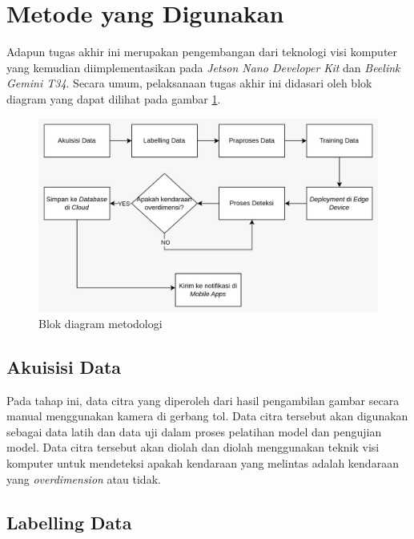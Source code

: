 \section{Metode yang Digunakan}

Adapun tugas akhir ini merupakan pengembangan dari teknologi visi komputer yang kemudian diimplementasikan pada \emph{Jetson Nano Developer Kit} dan \emph{Beelink Gemini T34}. Secara umum, pelaksanaan tugas akhir ini didasari oleh blok diagram yang dapat dilihat pada gambar \ref{fig:blockdiagrammethod}.

\begin{figure}[H]
  \centering

  \includegraphics[scale=0.25]{gambar/bab3-block-diagram.jpeg}

  \caption{Blok diagram metodologi}
  \label{fig:blockdiagrammethod}
\end{figure}

\subsection{Akuisisi Data}

Pada tahap ini, data citra yang diperoleh dari hasil pengambilan gambar secara manual menggunakan kamera di gerbang tol. Data citra tersebut akan digunakan sebagai data latih dan data uji dalam proses pelatihan model dan pengujian model. Data citra tersebut akan diolah dan diolah menggunakan teknik visi komputer untuk mendeteksi apakah kendaraan yang melintas adalah kendaraan yang \emph{overdimension} atau tidak.

\subsection{Labelling Data}

